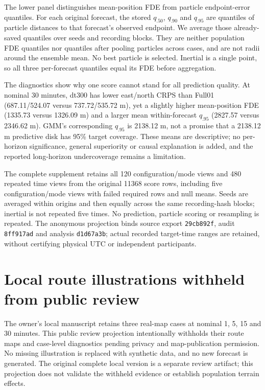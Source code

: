 The lower panel distinguishes mean-position FDE from particle endpoint-error
quantiles. For each original forecast, the stored $q_{.50}$, $q_{.90}$ and
$q_{.95}$ are quantiles of particle distances to that forecast's observed
endpoint. We average those already-saved quantiles over seeds and recording
blocks. They are neither population FDE quantiles nor quantiles after pooling
particles across cases, and are not radii around the ensemble mean. No best
particle is selected. Inertial is a single point, so all three per-forecast
quantiles equal its FDE before aggregation.

The diagnostics show why one score cannot stand for all prediction quality.
At nominal 30 minutes, dt300 has lower east/north CRPS than Full01
(687.11/524.07 versus 737.72/535.72 m), yet a slightly higher mean-position
FDE (1335.73 versus 1326.09 m) and a larger mean within-forecast $q_{.95}$
(2827.57 versus 2346.62 m). GMM's corresponding $q_{.95}$ is 2138.12 m,
not a promise that a 2138.12 m predictive disk has 95\% target coverage.
These means are descriptive; no per-horizon significance, general superiority
or causal explanation is added, and the reported long-horizon undercoverage
remains a limitation.

The complete  supplement retains all
120 configuration/mode views and 480 repeated time views from the original
11368 score rows, including five configuration/mode views with failed required
rows and null means. Seeds are averaged within origins and then equally
across the same recording-hash blocks; inertial is not repeated five times.
No prediction, particle scoring or resampling is repeated. The anonymous
projection binds source export \texttt{29cb892f}, audit \texttt{8ff917ad} and
analysis \texttt{d1d67a3b}; actual recorded target-time ranges are retained,
without certifying physical UTC or independent participants.



\section{Local route illustrations withheld from public review}
\label{sec:case-horizons}\hypertarget{sec:case-horizons}{}
The owner's local manuscript retains three real-map cases at nominal
1, 5, 15 and 30 minutes. This public review projection intentionally
withholds their route maps and case-level diagnostics pending privacy and
map-publication permission. No missing illustration is replaced with
synthetic data, and no new forecast is generated. The original complete
local version is a separate review artifact; this projection does not
validate the withheld evidence or establish population terrain effects.

